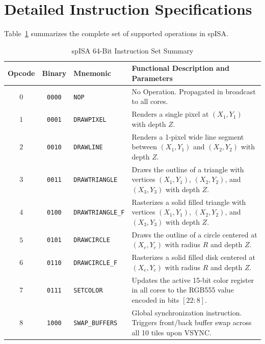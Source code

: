 \section{Detailed Instruction Specifications}
Table~\ref{tab:spisa_summary} summarizes the complete set of supported operations in spISA.

\begin{table}[htbp]
\centering
\caption{spISA 64-Bit Instruction Set Summary}
\label{tab:spisa_summary}
\begin{tabular}{@{}cclp{7.0cm}@{}}
\toprule
\textbf{Opcode} & \textbf{Binary} & \textbf{Mnemonic} & \textbf{Functional Description and Parameters} \\ \midrule
$0$ & \texttt{0000} & \texttt{NOP} & No Operation. Propagated in broadcast to all cores. \\
$1$ & \texttt{0001} & \texttt{DRAWPIXEL} & Renders a single pixel at $(X_1, Y_1)$ with depth $Z$. \\
$2$ & \texttt{0010} & \texttt{DRAWLINE} & Renders a 1-pixel wide line segment between $(X_1, Y_1)$ and $(X_2, Y_2)$ with depth $Z$. \\
$3$ & \texttt{0011} & \texttt{DRAWTRIANGLE} & Draws the outline of a triangle with vertices $(X_1, Y_1)$, $(X_2, Y_2)$, and $(X_3, Y_3)$ with depth $Z$. \\
$4$ & \texttt{0100} & \texttt{DRAWTRIANGLE\_F} & Rasterizes a solid filled triangle with vertices $(X_1, Y_1)$, $(X_2, Y_2)$, and $(X_3, Y_3)$ with depth $Z$. \\
$5$ & \texttt{0101} & \texttt{DRAWCIRCLE} & Draws the outline of a circle centered at $(X_c, Y_c)$ with radius $R$ and depth $Z$. \\
$6$ & \texttt{0110} & \texttt{DRAWCIRCLE\_F} & Rasterizes a solid filled disk centered at $(X_c, Y_c)$ with radius $R$ and depth $Z$. \\
$7$ & \texttt{0111} & \texttt{SETCOLOR} & Updates the active 15-bit color register in all cores to the RGB555 value encoded in bits $[22:8]$. \\
$8$ & \texttt{1000} & \texttt{SWAP\_BUFFERS} & Global synchronization instruction. Triggers front/back buffer swap across all 10 tiles upon VSYNC. \\ \bottomrule
\end{tabular}
\end{table}

